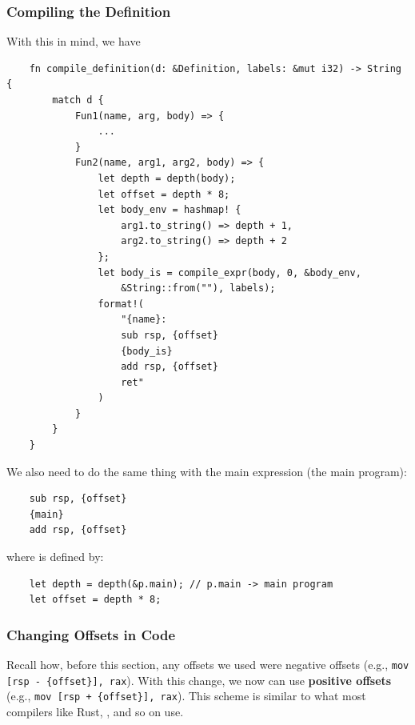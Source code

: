 \subsubsection{Compiling the Definition}
With this in mind, we have 
\begin{verbatim}
    fn compile_definition(d: &Definition, labels: &mut i32) -> String {
        match d {
            Fun1(name, arg, body) => {
                ...
            }
            Fun2(name, arg1, arg2, body) => {
                let depth = depth(body);
                let offset = depth * 8;
                let body_env = hashmap! {
                    arg1.to_string() => depth + 1,
                    arg2.to_string() => depth + 2
                };
                let body_is = compile_expr(body, 0, &body_env, 
                    &String::from(""), labels);
                format!(
                    "{name}:
                    sub rsp, {offset}
                    {body_is}
                    add rsp, {offset}
                    ret"
                )
            }
        }
    }\end{verbatim}
We also need to do the same thing with the main expression (the main program):
\begin{verbatim}
    sub rsp, {offset}
    {main}
    add rsp, {offset}\end{verbatim}
where  is defined by: 
\begin{verbatim}
    let depth = depth(&p.main); // p.main -> main program
    let offset = depth * 8;\end{verbatim}

\subsubsection{Changing Offsets in Code}
Recall how, before this section, any offsets we used were negative offsets (e.g., \verb|mov [rsp - {offset}], rax|). With this change, we now can use \textbf{positive offsets} (e.g., \verb|mov [rsp + {offset}], rax|). This scheme is similar to what most compilers like Rust, , and so on use. 